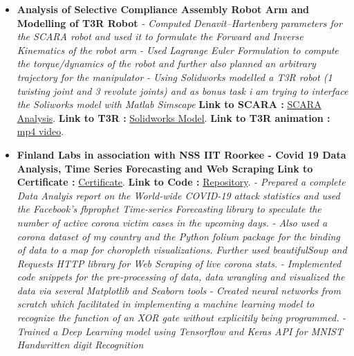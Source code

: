 \documentclass[a4paper,12pt]{article}
\begin{document}
\begin{itemize}
    \item{\textbf{\large{Analysis of Selective Compliance Assembly Robot Arm and Modelling of T3R Robot}}
    \newline
    \textit{- Computed Denavit–Hartenberg parameters for the SCARA robot and used it to formulate the Forward and Inverse Kinematics of the robot arm} 
    \newline
    \textit{- Used Lagrange Euler Formulation to compute the torque/dynamics of the robot and further also planned an arbitrary trajectory for the manipulator} 
    \newline
    \textit{- Using Solidworks modelled a T3R robot (1 twisting joint and 3 revolute joints) and as bonus task i am trying to interface the Soliworks model with Matlab Simscape}} 
    \newline
    \textbf{ Link to SCARA :} \href{https://github.com/teetangh/Robotics-Projects/blob/master/SCARA_Robot_Analysis.pdf}{SCARA Analysis}.
    \newline
    \textbf{ Link to T3R :} \href{https://github.com/teetangh/Robotics-Projects/tree/master/T3R%20Robot}{Solidworks Model}.
    \textbf{ Link to T3R animation :} \href{https://github.com/teetangh/Robotics-Projects/blob/master/T3R%20Robot/Resources/T3R%20Animation.mp4}{mp4 video}.
    \newline
    \item{\textbf{\large{Finland Labs in association with NSS IIT Roorkee - Covid 19 Data Analysis, Time Series Forecasting and Web Scraping}}
    \newline
    \textbf{Link to Certificate :} \href{https://github.com/teetangh/Kaustav-All-Certifications/blob/master/Artificial%20Intelligence/Finland%20Labs%20and%20IITR/Covid%2019%20Analysis%20-%20AI%20and%20ML.pdf}{Certificate}.
    \textbf{ Link to Code :} \href{https://github.com/teetangh/FinlandLabs-IITR-COVID-19-Analysis}{Repository}.
    \newline
    \textit{- Prepared a complete Data Analyis report on the World-wide COVID-19 attack statistics and used the Facebook's fbprophet Time-series Forecasting library to speculate the number of active corona victim cases in the upcoming days.} 
    \newline
    \textit{- Also used a corona dataset of my country and the Python folium package for the binding of data to a map for choropleth visualizations. Further used beautifulSoup and Requests HTTP library for Web Scraping of live corona stats.}
    \newline
    \textit{- Implemented code snippets for the pre-processing of data, data wrangling and visualized the data via several Matplotlib and Seaborn tools }
    \newline
    \textit{- Created neural networks from scratch which facilitated in implementing a machine learning model to recognize the function of an XOR gate without explicitily being programmed.}
    \newline
    \textit{- Trained a Deep Learning model using Tensorflow and Keras API for MNIST Handwritten digit Recognition}}
    

\end{itemize}
\end{document}
